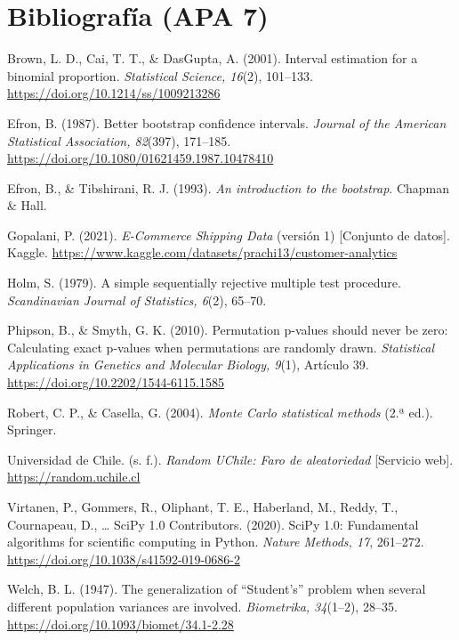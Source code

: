 \documentclass[11pt,a4paper]{article}
\begin{document}
\section{Bibliografía (APA 7)}
{\footnotesize\setlength{\parindent}{-1.5em}\setlength{\leftskip}{1.5em}\setlength{\parskip}{0.15em}
Brown, L. D., Cai, T. T., \& DasGupta, A. (2001). Interval estimation for a binomial proportion. \emph{Statistical Science, 16}(2), 101--133. \url{https://doi.org/10.1214/ss/1009213286}

Efron, B. (1987). Better bootstrap confidence intervals. \emph{Journal of the American Statistical Association, 82}(397), 171--185. \url{https://doi.org/10.1080/01621459.1987.10478410}

Efron, B., \& Tibshirani, R. J. (1993). \emph{An introduction to the bootstrap}. Chapman \& Hall.

Gopalani, P. (2021). \emph{E-Commerce Shipping Data} (versión 1) [Conjunto de datos]. Kaggle. \url{https://www.kaggle.com/datasets/prachi13/customer-analytics}

Holm, S. (1979). A simple sequentially rejective multiple test procedure. \emph{Scandinavian Journal of Statistics, 6}(2), 65--70.

Phipson, B., \& Smyth, G. K. (2010). Permutation p-values should never be zero: Calculating exact p-values when permutations are randomly drawn. \emph{Statistical Applications in Genetics and Molecular Biology, 9}(1), Artículo 39. \url{https://doi.org/10.2202/1544-6115.1585}

Robert, C. P., \& Casella, G. (2004). \emph{Monte Carlo statistical methods} (2.ª ed.). Springer.

Universidad de Chile. (s. f.). \emph{Random UChile: Faro de aleatoriedad} [Servicio web]. \url{https://random.uchile.cl}

Virtanen, P., Gommers, R., Oliphant, T. E., Haberland, M., Reddy, T., Cournapeau, D., \ldots{} SciPy 1.0 Contributors. (2020). SciPy 1.0: Fundamental algorithms for scientific computing in Python. \emph{Nature Methods, 17}, 261--272. \url{https://doi.org/10.1038/s41592-019-0686-2}

Welch, B. L. (1947). The generalization of ``Student's'' problem when several different population variances are involved. \emph{Biometrika, 34}(1--2), 28--35. \url{https://doi.org/10.1093/biomet/34.1-2.28}\par}
\end{document}
